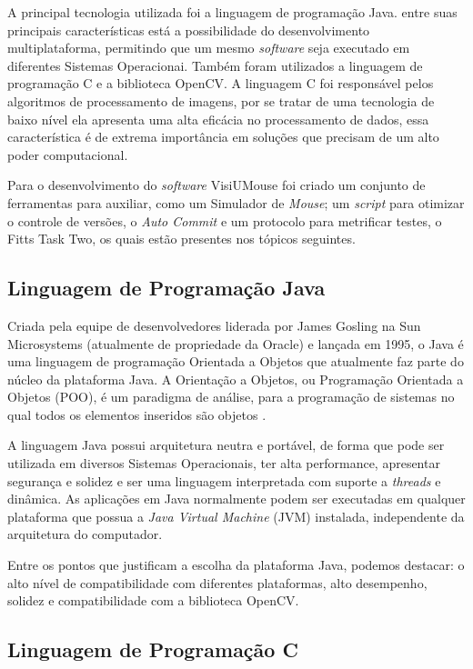 A principal tecnologia utilizada foi a linguagem de programação Java. entre suas principais características está a possibilidade do desenvolvimento multiplataforma, permitindo que um mesmo \textit{software} seja executado em diferentes Sistemas Operacionai. Também foram utilizados a linguagem de programação C e a biblioteca OpenCV. A linguagem C foi responsável pelos algoritmos de processamento de imagens, por se tratar de uma tecnologia de baixo nível ela apresenta uma alta eficácia no processamento de dados, essa característica é de extrema importância em soluções que precisam de um alto poder computacional.

Para o desenvolvimento do \textit{software} VisiUMouse foi criado um conjunto de ferramentas para auxiliar, como um Simulador de \textit{Mouse}; um \textit{script} para otimizar o controle de versões, o \textit{Auto Commit} e um protocolo para metrificar testes, o Fitts Task Two, os quais estão presentes nos tópicos seguintes.

\subsection{Linguagem de Programação Java}

Criada pela equipe de desenvolvedores liderada por James Gosling na Sun Microsystems (atualmente de propriedade da Oracle) e lançada em 1995, o Java é uma linguagem de programação Orientada a Objetos que atualmente faz parte do núcleo da plataforma Java. A Orientação a Objetos, ou Programação Orientada a Objetos (POO), é um paradigma de análise, para a programação de sistemas no qual todos os elementos inseridos são objetos \cite{urma2014java}.

A linguagem Java possui arquitetura neutra e portável, de forma que pode ser utilizada em diversos Sistemas Operacionais, ter alta performance, apresentar segurança e solidez e ser uma linguagem interpretada com suporte a \textit{threads} e dinâmica. As aplicações em Java normalmente podem ser executadas em qualquer plataforma que possua a \textit{Java Virtual Machine} (JVM) instalada, independente da arquitetura do computador.

Entre os pontos que justificam a escolha da plataforma Java, podemos destacar: o alto nível de compatibilidade com diferentes plataformas, alto desempenho, solidez e compatibilidade com a biblioteca OpenCV.

\subsection{Linguagem de Programação C}

